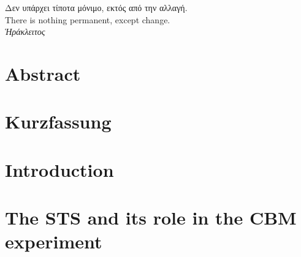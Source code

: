 \newcommand{\myGlobalStyle}[1]{{\footnotesize\sffamily\color{blue!100!black} #1}}
 
\newcommand{\myNumberStyle}[1]{{\footnotesize\sffamily\color{brown!100!black} #1}}









\frontmatter



\thispagestyle{empty}
\begin{center}

\hspace{0pt}
\vfill

\Large\foreignlanguage{greek}{Δεν υπάρχει τίποτα μόνιμο, εκτός από την αλλαγή.\\}
\vspace{0.5cm}
\normalsize{There is nothing permanent, except change.\\}
\vspace{1cm}
\color{auburn}\foreignlanguage{greek}{\textit{Ἡράκλειτος}}
\vfill
\hspace{0pt}
\end{center}
\chapter*{Abstract}
\chapter*{Kurzfassung}
%
\mainmatter
\chapter{Introduction}
\label{chap:intro}



\chapter{The STS and its role in the CBM experiment}
\label{chap:CBM_STS}


